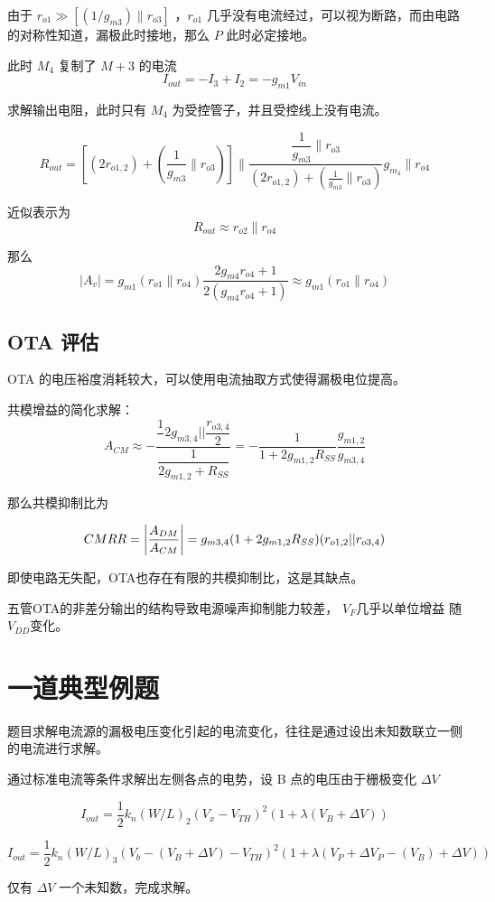 \documentclass[cn,11pt,chinese,black,simple]{../elegantbook}
\begin{document}
由于 \(r_{o1} \gg \left[(1/g_{m3}) \| r_{o3}\right]\) ，\(r_{o1}\) 几乎没有电流经过，可以视为断路，而由电路的对称性知道，漏极此时接地，那么 \(P\) 此时必定接地。


此时 \(M_4\) 复制了 \(M+3\) 的电流 
\[I_{out} = - I_3 + I_2 = -g_{m1} V_{in}\]


 
求解输出电阻，此时只有 \(M_4\) 为受控管子，并且受控线上没有电流。

\[R_{out} = \left[(2 r_{o1,2}) + (\frac{1}{g_{m3}} \| r_{o3} ) \right] \| \dfrac{\dfrac{1}{g_{m3}} \| r_{o3}}{(2 r_{o1,2}) + (\frac{1}{g_{m3}} \| r_{o3} ) } g_{m_4} \| r_{o4}   \] 

近似表示为
\[R_{out} \approx r_{o2} \| r_{o4}\]

那么 \[ |A_v| =  g_{m1} (r_{o1} \| r_{o4}) \frac{2 g_{m4} r_{o4} + 1}{2 (g_{m4} r_{o4} + 1)} \approx g_{m1} (r_{o1} \| r_{o4}) \]


\subsection{OTA 评估}

OTA 的电压裕度消耗较大，可以使用电流抽取方式使得漏极电位提高。


共模增益的简化求解：\[A_{CM} \approx - \frac{\dfrac{1}{}2 g_{m3,4} || \dfrac{r_{o3,4}}{2}}{\dfrac{1}{2 g_{m1,2} +R_{SS} }} = -\frac{1}{1 + 2 g_{m1,2} R_{SS}} \frac{g_{m1,2}}{g_{m3,4}}\]


那么共模抑制比为 

\[CMRR = \left| \frac{A_{DM}}{A_{CM}} \right| = g_{m3,4} (1 + 2 g_{m1,2} R_{SS})(r_{o1,2} || r_{o3,4})\]

即使电路无失配，OTA也存在有限的共模抑制比，这是其缺点。

五管OTA的非差分输出的结构导致电源噪声抑制能力较差， \(V_F\)几乎以单位增益
随 \(V_{DD}\)变化。

\section{一道典型例题}

题目求解电流源的漏极电压变化引起的电流变化，往往是通过设出未知数联立一侧的电流进行求解。

通过标准电流等条件求解出左侧各点的电势，设 B 点的电压由于栅极变化 \(\Delta V\) 

\[I_{out} = \frac{1}{2} k_n (W/L)_2 (V_x - V_{TH})^2 (1 + \lambda (V_B + \Delta V)) \]

\[I_{out} = \frac{1}{2} k_n (W/L)_3 (V_b - (V_B + \Delta V) - V_{TH})^2 (1 + \lambda (V_P + \Delta V_P - (V_B) + \Delta V))\]

仅有 \(\Delta V\) 一个未知数，完成求解。



\ifx\mainclass\undefined
\end{document}
